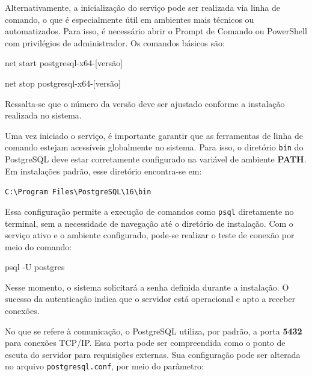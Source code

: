 Alternativamente, a inicialização do serviço pode ser realizada via linha de comando, o que é especialmente útil em ambientes mais técnicos ou automatizados. Para isso, é necessário abrir o Prompt de Comando ou PowerShell com privilégios de administrador. Os comandos básicos são:

\begin{tcolorbox}[breakable, colback=blue!5,colframe=blue!40!black,title=Inicializar o seriço]
net start postgresql-x64-[versão]
\end{tcolorbox}

\begin{tcolorbox}[breakable, colback=blue!5,colframe=blue!40!black,title=Parar o seriço]
net stop postgresql-x64-[versão]
\end{tcolorbox}

Ressalta-se que o número da versão deve ser ajustado conforme a instalação realizada no sistema.

Uma vez iniciado o serviço, é importante garantir que as ferramentas de linha de comando estejam acessíveis globalmente no sistema. Para isso, o diretório \texttt{bin} do PostgreSQL deve estar corretamente configurado na variável de ambiente \textbf{PATH}. Em instalações padrão, esse diretório encontra-se em:

\begin{center}
\texttt{C:\textbackslash Program Files\textbackslash PostgreSQL\textbackslash 16\textbackslash bin}
\end{center}

Essa configuração permite a execução de comandos como \texttt{psql} diretamente no terminal, sem a necessidade de navegação até o diretório de instalação. Com o serviço ativo e o ambiente configurado, pode-se realizar o teste de conexão por meio do comando:

\begin{tcolorbox}[breakable, colback=blue!5,colframe=blue!40!black,title=Teste de conexão]
psql -U postgres
\end{tcolorbox}

Nesse momento, o sistema solicitará a senha definida durante a instalação. O sucesso da autenticação indica que o servidor está operacional e apto a receber conexões.

No que se refere à comunicação, o PostgreSQL utiliza, por padrão, a porta \textbf{5432} para conexões TCP/IP. Essa porta pode ser compreendida como o ponto de escuta do servidor para requisições externas. Sua configuração pode ser alterada no arquivo \texttt{postgresql.conf}, por meio do parâmetro:

